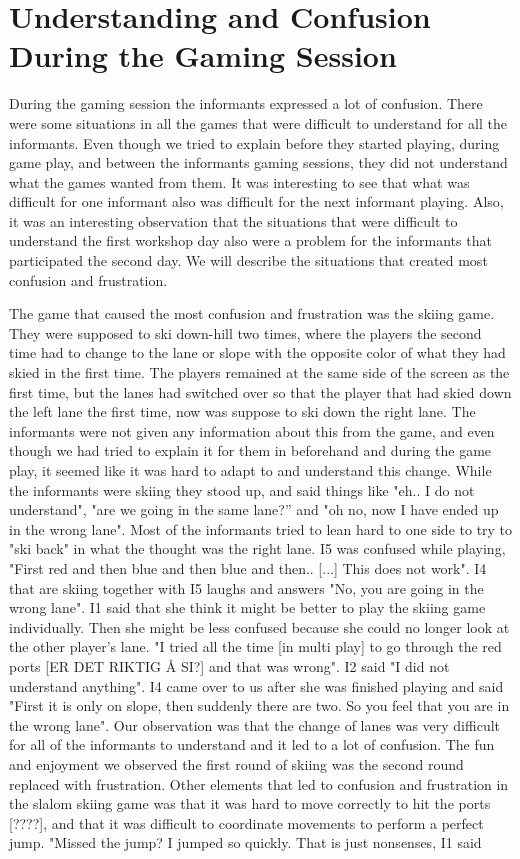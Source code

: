\section{Understanding and Confusion During the Gaming Session}
During the gaming session the informants expressed a lot of confusion. There were some situations in all the games that were difficult to understand for all the informants. Even though we tried to explain before they started playing, during game play, and between the informants gaming sessions, they did not understand what the games wanted from them. It was interesting to see that what was difficult for one informant also was difficult for the next informant playing. Also, it was an interesting observation that the situations that were difficult to understand the first workshop day also were a problem for the informants that participated the second day. We will describe the situations that created most confusion and frustration.

The game that caused the most confusion and frustration was the skiing game. They were supposed to ski down-hill two times, where the players the second time had to change to the lane or slope with the opposite color of what they had skied in the first time. The players remained at the same side of the screen as the first time, but the lanes had switched over so that the player that had skied down the left lane the first time, now was suppose to ski down the right lane. The informants were not given any information about this from the game, and even though we had tried to explain it for them in beforehand and during the game play, it seemed like it was hard to adapt to and understand this change. While the informants were skiing they stood up, and said things like "eh.. I do not understand", "are we going in the same lane?” and "oh no, now I have ended up in the wrong lane". Most of the informants tried to lean hard to one side to try to "ski back" in what the thought was the right lane. I5 was confused while playing, "First red and then blue and then blue and then.. [...] This does not work". I4 that are skiing together with I5 laughs and answers "No, you are going in the wrong lane". I1 said that she think it might be better to play the skiing game individually. Then she might be less confused because she could no longer look at the other player's lane. "I tried all the time [in multi play] to go through the red ports [ER DET RIKTIG Å SI?] and that was wrong". I2 said "I did not understand anything". I4 came over to us after she was finished playing and said "First it is only on slope, then suddenly there are two. So you feel that you are in the wrong lane". Our observation was that the change of lanes was very difficult for all of the informants to understand and it led to a lot of confusion. The fun and enjoyment we observed the first round of skiing was the second round replaced with frustration. Other elements that led to confusion and frustration in the slalom skiing game was that it was hard to move correctly to hit the ports [????], and that it was difficult to coordinate movements to perform a perfect jump. "Missed the jump? I jumped so quickly. That is just nonsenses, I1 said


